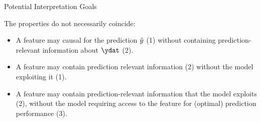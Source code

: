\documentclass[11pt,compress,t,notes=noshow, xcolor=table]{beamer}
\begin{document}
\begin{vbframe}{Potential Interpretation Goals}

The properties do not necessarily coincide:

\begin{itemize}
  \item A feature may causal for the prediction $\yh$ (1) without containing prediction-relevant information about $\ydat$ (2).
  \item A feature may contain prediction relevant information (2) without the model exploiting it (1).
  \item A feature may contain prediction-relevant information that the model exploits (2), without the model requiring access to the feature for (optimal) prediction performance (3).
\end{itemize}

\end{vbframe}

\endlecture
\end{document}
